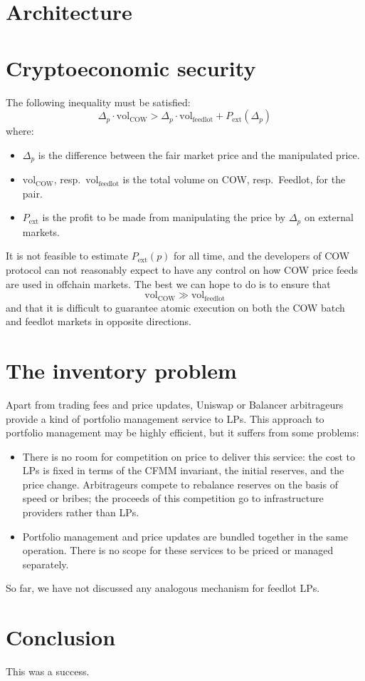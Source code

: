 \documentclass[a4paper,10pt]{article}
\newcommand \Vol {\mathrm{vol}}
\begin{document}
\section{Architecture}

\section{Cryptoeconomic security}

The following inequality must be satisfied:
\[ \Delta_p \cdot\Vol_\mathrm{COW} > \Delta_p\cdot \Vol_\mathrm{feedlot} + P_\mathrm{ext}(\Delta_p)  \]
where:
\begin{itemize}
  \item $\Delta_p$ is the difference between the fair market price and the manipulated price.
  \item $\Vol_\mathrm{COW}$, resp.~$\Vol_\mathrm{feedlot}$ is the total volume on COW, resp.~Feedlot, for the pair.
  \item $P_\mathrm{ext}$ is the profit to be made from manipulating the price by $\Delta_p$ on external markets.
\end{itemize}

It is not feasible to estimate $P_\mathrm{ext}(p)$ for all time, and the developers of COW protocol can not reasonably expect to have any control on how COW price feeds are used in offchain markets.
%
The best we can hope to do is to ensure that
\[
  \Vol_\mathrm{COW} \gg \Vol_\mathrm{feedlot}
\]
and that it is difficult to guarantee atomic execution on both the COW batch and feedlot markets in opposite directions.

\section{The inventory problem}

Apart from trading fees and price updates, Uniswap or Balancer arbitrageurs provide a kind of portfolio management service to LPs.
%
This approach to portfolio management may be highly efficient, but it suffers from some problems:
\begin{itemize}
  \item 
    There is no room for competition on price to deliver this service: the cost to LPs is fixed in terms of the CFMM invariant, the initial reserves, and the price change.
    Arbitrageurs compete to rebalance reserves on the basis of speed or bribes; the proceeds of this competition go to infrastructure providers rather than LPs.
    
  \item
    Portfolio management and price updates are bundled together in the same operation. There is no scope for these services to be priced or managed separately.
    
\end{itemize}

So far, we have not discussed any analogous mechanism for feedlot LPs.

\section{Conclusion}

This was a success.

\printbibliography
\end{document}
